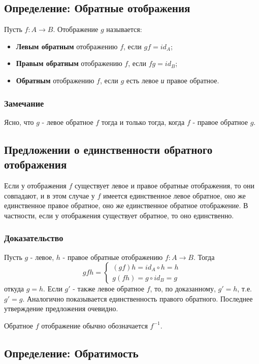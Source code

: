 \documentclass{article}
\begin{document}
\subsection{Определение: Обратные отображения}
Пусть $f: A \rightarrow B$. Отображение $g$ называется:
\begin{itemize}
\item \textbf{Левым обратным} отображению $f$, если $gf = id_A$;
\item \textbf{Правым обратным} отображению $f$, если $fg = id_B$;
\item \textbf{Обратным} отображению $f$, если $g$ есть левое \textit{и} правое обратное.
\end{itemize}

\subsubsection*{Замечание}
Ясно, что $g$ - левое обратное $f$ тогда и только тогда, когда $f$ - правое обратное $g$.

\subsection{Предложении о единственности обратного отображения}

Если у отображения $f$ существует левое и правое обратные отображения, то они совпадают, и в этом случае у $f$ имеется единственное левое обратное, оно же единственное правое обратное, оно же единственное обратное отображение. В частности, если у отображения существует обратное, то оно единственно.

\subsubsection*{Доказательство}
Пусть $g$ - левое, $h$ - правое обратные отображению $f : A \rightarrow B$. Тогда \[
gfh = \begin{cases}
(gf)h = id_A \circ h = h \\
g(fh) = g \circ id_B = g
\end{cases}
\] откуда $g = h$. Если $g'$ - также левое обратное $f$, то, по доказанному, $g' = h$, т.е. $g' = g$. Аналогично показывается единственность правого обратного. Последнее утверждение предложения очевидно.

Обратное $f$ отображение обычно обозначается $f^{-1}$.

\subsection{Определение: Обратимость}
\end{document}

